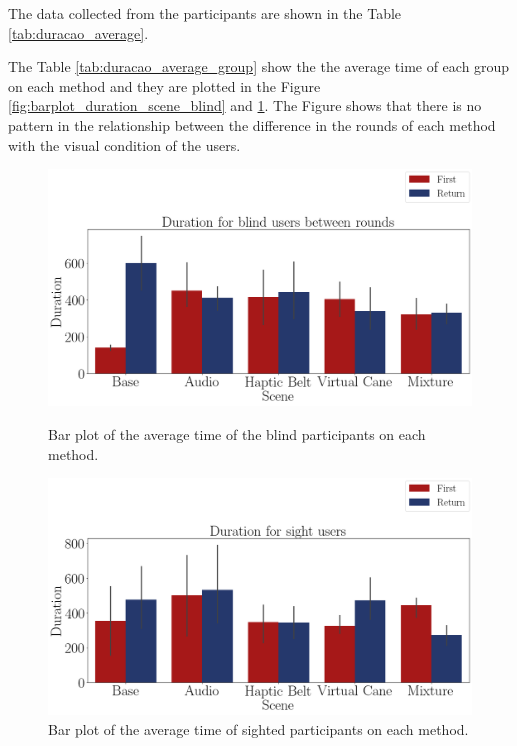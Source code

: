 
The data collected from the participants are shown in the Table \ref{tab:duracao_average}.



The Table \ref{tab:duracao_average_group} show the the average time of each group on each method and they are plotted in the Figure \ref{fig:barplot_duration_scene_blind} and \ref{fig:barplot_duration_scene_sight}. The Figure shows that there is no pattern in the relationship between the difference in the rounds of each method with the visual condition of the users. 

%



\begin{figure}[!htb]
    \centering
    \begin{minipage}{\textwidth}
        \centering
        \includegraphics[width = 0.8\linewidth]{Resultados/Tempo/Figuras/png/barplot_duration_scene_blind.png}
        \caption{Bar plot of the average time of the blind participants on each method.}
        \label{fig:barplot_duration_scene_blind}
    \end{minipage}
    \begin{minipage}{\textwidth}
        \centering
        \includegraphics[width = 0.8\linewidth]{Resultados/Tempo/Figuras/png/barplot_duration_scene_sight.png}
        \caption{Bar plot of the average time of sighted participants on each method.}
        \label{fig:barplot_duration_scene_sight}
    \end{minipage}
\end{figure}


